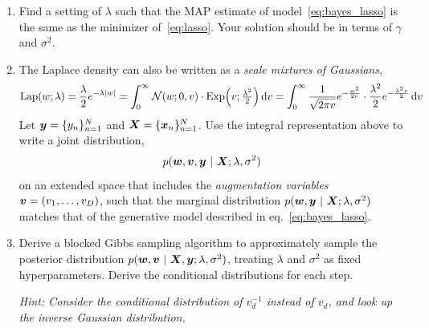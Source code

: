 \documentclass[11pt]{article}
\begin{document}
\begin{enumerate}[label=(\alph*)]
    \item Find a setting of $\lambda$ such that the MAP estimate of model~\eqref{eq:bayes_lasso} is the same as the minimizer of~\eqref{eq:lasso}. Your solution should be in terms of $\gamma$ and $\sigma^2$.
    
    \item The Laplace density can also be written as a \textit{scale mixtures of Gaussians},
    \begin{align*}
        \mathrm{Lap}(w; \lambda) = \frac{\lambda}{2} e^{-\lambda |w|} 
        = \int_0^\infty \mathcal{N}(w; 0, v) \cdot \mathrm{Exp}\Big(v; \tfrac{\lambda^2}{2} \Big) \mathop{}\!\mathrm{d} v
        = \int_0^\infty \frac{1}{\sqrt{2\pi v}} e^{-\frac{w^2}{2v}} \cdot \frac{\lambda^2}{2} e^{-\frac{\lambda^2v}{2}} \mathop{}\!\mathrm{d} v
    \end{align*}
    Let $\boldsymbol{y} = \{y_n\}_{n=1}^N$ and $\boldsymbol{X} = \{\boldsymbol{x}_n\}_{n=1}^N$. Use the integral representation above to write a joint distribution,
    \begin{align*}
        p(\boldsymbol{w}, \boldsymbol{v}, \boldsymbol{y} ~\vert~ \boldsymbol{X}; \lambda, \sigma^2)
    \end{align*}
    on an extended space that includes the \textit{augmentation variables} ${\boldsymbol{v} = (v_1, \ldots, v_D)}$, such that the marginal distribution $p(\boldsymbol{w}, \boldsymbol{y} ~\vert~ \boldsymbol{X}; \lambda, \sigma^2)$ matches that of the generative model described in eq.~\eqref{eq:bayes_lasso}.
    
    \item Derive a blocked Gibbs sampling algorithm to approximately sample the posterior distribution ${p(\boldsymbol{w}, \boldsymbol{v} ~\vert~ \boldsymbol{X}, \boldsymbol{y}; \lambda, \sigma^2)}$, treating $\lambda$ and $\sigma^2$ as fixed hyperparameters. Derive the conditional distributions for each step.
    
    \textit{Hint: Consider the conditional distribution of $v_d^{-1}$ instead of $v_d$, and look up the inverse Gaussian distribution.}
    
\end{enumerate}
\end{document}
